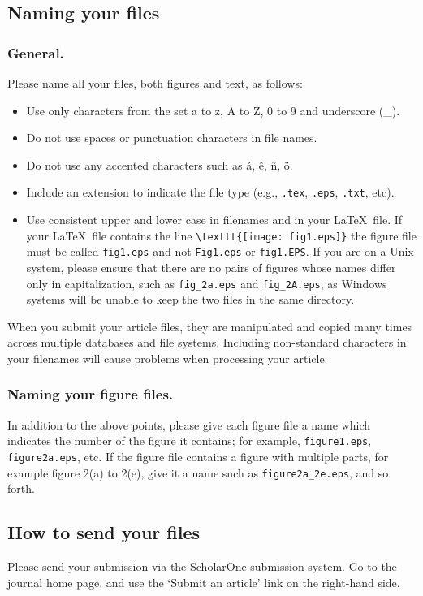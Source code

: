 \documentclass[12pt]{iopart}
\begin{document}
\subsection{Naming your files}
\subsubsection{General.}
Please name all your files, both figures and text, as follows:
\begin{itemize}
\item Use only characters from the set a to z, A to Z, 0 to 9 and underscore (\_).
\item Do not use spaces or punctuation characters in file names.
\item Do not use any accented characters such as
\'a, \^e, \~n, \"o.
\item Include an extension to indicate the file type (e.g., \verb".tex", \verb".eps", \verb".txt", etc).
\item Use consistent upper and lower case in filenames and in your \LaTeX\ file.
If your \LaTeX\ file contains the line \verb"\texttt{[image: fig1.eps]}" the figure file must be called
\verb"fig1.eps" and not \verb"Fig1.eps" or \verb"fig1.EPS".  If you are on a Unix system, please ensure that
there are no pairs of figures whose names differ only in capitalization, such as \verb"fig_2a.eps" and \verb"fig_2A.eps",
as Windows systems will be unable to keep the two files in the same directory.
\end{itemize}
When you submit your article files, they are manipulated
and copied many times across multiple databases and file systems. Including non-standard
characters in your filenames will cause problems when processing your article.
\subsubsection{\label{fname}Naming your figure files.} In addition to the above points, please give each figure file a name which indicates the number of the figure it contains; for example, \verb"figure1.eps", \verb"figure2a.eps", etc. If the figure file contains a figure with multiple parts, for example figure 2(a) to 2(e), give it a name such as \verb"figure2a_2e.eps", and so forth.
\subsection{How to send your files}
Please send your submission via the ScholarOne submission system.  Go to the journal home
page, and use the `Submit an article' link on the right-hand side.
\end{document}
